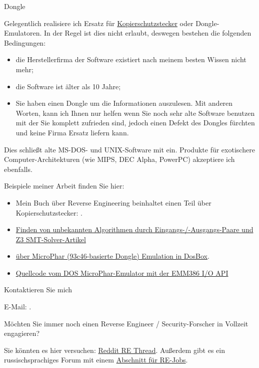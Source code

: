 \large Dongle \normalsize

Gelegentlich realisiere ich Ersatz für
\href{https://en.wikipedia.org/wiki/Software_protection_dongle}{Kopierschutzstecker} oder Dongle-Emulatoren.
In der Regel ist dies nicht erlaubt, deswegen bestehen die folgenden Bedingungen:

\begin{itemize}
\item die Herstellerfirma der Software existiert nach meinem besten Wissen nicht mehr;
\item die Software ist älter als 10 Jahre;
\item Sie haben einen Dongle um die Informationen auszulesen. Mit anderen Worten, kann ich Ihnen
nur helfen wenn Sie noch sehr alte Software benutzen mit der Sie komplett zufrieden sind, jedoch
einen Defekt des Dongles fürchten und keine Firma Ersatz liefern kann.
\end{itemize}

Dies schließt alte MS-DOS- und UNIX-Software mit ein. Produkte für exotischere Computer-Architekturen
(wie MIPS, DEC Alpha, PowerPC) akzeptiere ich ebenfalls.

Beispiele meiner Arbeit finden Sie hier:

\begin{itemize}
\item Mein Buch über Reverse Engineering beinhaltet einen Teil über Kopierschutzstecker: .
\item \href{http://yurichev.com/writings/z3_rockey.pdf}{Finden von unbekannten Algorithmen durch Eingangs-/-Ausgangs-Paare
und Z3 SMT-Solver-Artikel}
\item \href{http://yurichev.com/blog/56/}{über MicroPhar (93c46-basierte Dongle) Emulation in DosBox}.
\item \href{http://conus.info/dongle/src/microph.asm}{Quellcode vom DOS MicroPhar-Emulator mit der EMM386 I/O API}
\end{itemize}

\large Kontaktieren Sie mich \normalsize

E-Mail: \GTT{\EMAIL}.

\large Möchten Sie immer noch einen Reverse Engineer / Security-Forscher in Vollzeit engagieren? \normalsize

Sie könnten es hier versuchen: \href{https://www.reddit.com/r/ReverseEngineering/comments/49cza0/rreverseengineerings_2015_triannual_hiring_thread/}{Reddit RE Thread}.
Außerdem gibt es ein russischsprachiges Forum mit einem \href{https://forum.reverse4you.org/forumdisplay.php?f=252}{Abschnitt für RE-Jobs}.

\vspace*{\fill}
\vfill
